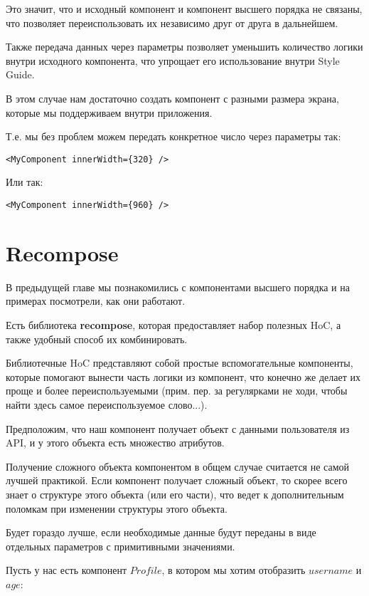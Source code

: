 Это значит, что и исходный компонент и компонент высшего порядка не связаны, что позволяет переиспользовать их независимо друг от друга в дальнейшем.

Также передача данных через параметры позволяет уменьшить количество логики внутри исходного компонента, что упрощает его использование внутри Style Guide. 

В этом случае нам достаточно создать компонент с разными размера экрана, которые мы поддерживаем внутри приложения.

Т.е. мы без проблем можем передать конкретное число через параметры так:

\begin{lstlisting}
<MyComponent innerWidth={320} />	
\end{lstlisting}

Или так:

\begin{lstlisting}
<MyComponent innerWidth={960} />	
\end{lstlisting}


\section{Recompose}

В предыдущей главе мы познакомились с компонентами высшего порядка и на примерах посмотрели, как они работают.

Есть библиотека \textbf{recompose}, которая предоставляет набор полезных HoC, а также удобный способ их комбинировать.

Библиотечные HoC представляют собой простые вспомогательные компоненты, которые помогают вынести часть логики из компонент, что конечно же делает их проще и более переиспользуемыми (прим. пер. за регулярками не ходи, чтобы найти здесь самое переиспользуемое слово...).

Предположим, что наш компонент получает объект с данными пользователя из API, и у этого объекта есть множество атрибутов.

Получение сложного объекта компонентом в общем случае считается не самой лучшей практикой. Если компонент получает сложный объект, то скорее всего знает о структуре этого объекта (или его части), что ведет к дополнительным поломкам при изменении структуры этого объекта.

Будет гораздо лучше, если необходимые данные будут переданы в виде отдельных параметров с примитивными значениями.

Пусть у нас есть компонент $Profile$, в котором мы хотим отобразить $username$ и $age$:

